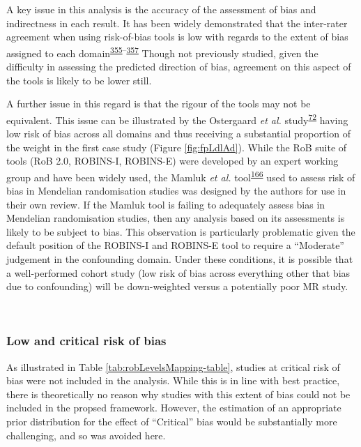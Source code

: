 \documentclass[a4paper, twoside]{templates/ociamthesis}
\begin{document}
A key issue in this analysis is the accuracy of the assessment of bias and indirectness in each result. It has been widely demonstrated that the inter-rater agreement when using risk-of-bias tools is low with regards to the extent of bias assigned to each domain\textsuperscript{\protect\hyperlink{ref-hartling2011}{355}--\protect\hyperlink{ref-minozzi2020}{357}} Though not previously studied, given the difficulty in assessing the predicted direction of bias, agreement on this aspect of the tools is likely to be lower still.

A further issue in this regard is that the rigour of the tools may not be equivalent. This issue can be illustrated by the Ostergaard \emph{et al.} study\textsuperscript{\protect\hyperlink{ref-ostergaard2015}{72}} having low risk of bias across all domains and thus receiving a substantial proportion of the weight in the first case study (Figure \ref{fig:fpLdlAd}). While the RoB suite of tools (RoB 2.0, ROBINS-I, ROBINS-E) were developed by an expert working group and have been widely used, the Mamluk \emph{et al.} tool\textsuperscript{\protect\hyperlink{ref-mamluk2020}{166}} used to assess risk of bias in Mendelian randomisation studies was designed by the authors for use in their own review. If the Mamluk tool is failing to adequately assess bias in Mendelian randomisation studies, then any analysis based on its assessments is likely to be subject to bias. This observation is particularly problematic given the default position of the ROBINS-I and ROBINS-E tool to require a ``Moderate'' judgement in the confounding domain. Under these conditions, it is possible that a well-performed cohort study (low risk of bias across everything other that bias due to confounding) will be down-weighted versus a potentially poor MR study.

~

\hypertarget{low-and-critical-risk-of-bias}{%
\subsubsection{Low and critical risk of bias}\label{low-and-critical-risk-of-bias}}

As illustrated in Table \ref{tab:robLevelsMapping-table}, studies at critical risk of bias were not included in the analysis. While this is in line with best practice, there is theoretically no reason why studies with this extent of bias could not be included in the propsed framework. However, the estimation of an appropriate prior distribution for the effect of ``Critical'' bias would be substantially more challenging, and so was avoided here.
\end{document}
